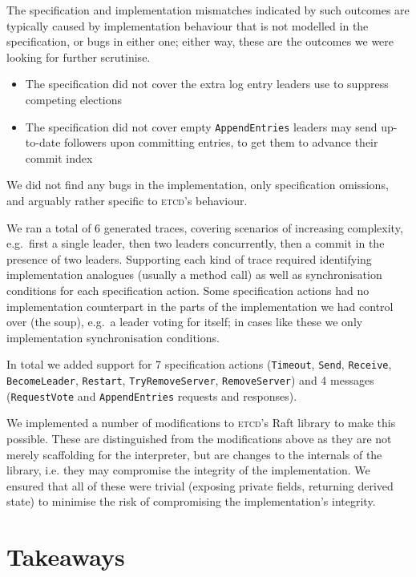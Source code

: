 \documentclass[a4paper]{article}
\newcommand{\tname}[1]{\textsc{#1}\xspace}
\newcommand{\etcd}{\tname{etcd}}
\begin{document}
The specification and implementation mismatches indicated by such outcomes are typically caused by implementation behaviour that is not modelled in the specification, or bugs in either one; either way, these are the outcomes we were looking for further scrutinise.

\begin{itemize}
\item The specification did not cover the extra log entry leaders use to suppress competing elections
\item The specification did not cover empty \texttt{AppendEntries} leaders may send up-to-date followers upon committing entries, to get them to advance their commit index
\end{itemize}

We did not find any bugs in the implementation, only specification omissions, and arguably rather specific to \etcd's behaviour.

We ran a total of 6 generated traces, covering scenarios of increasing complexity, e.g.~first a single leader, then two leaders concurrently, then a commit in the presence of two leaders.
%
Supporting each kind of trace required identifying implementation analogues (usually a method call) as well as synchronisation conditions for each specification action.
%
Some specification actions had no implementation counterpart in the parts of the implementation we had control over (the soup), e.g.~a leader voting for itself; in cases like these we only implementation synchronisation conditions.

In total we added support for 7 specification actions (\texttt{Timeout}, \texttt{Send}, \texttt{Receive}, \texttt{BecomeLeader}, \texttt{Restart}, \texttt{TryRemoveServer}, \texttt{RemoveServer}) and 4 messages (\texttt{RequestVote} and \texttt{AppendEntries} requests and responses).

We implemented a number of modifications to \etcd's Raft library to make this possible.
%
These are distinguished from the modifications above as they are not merely scaffolding for the interpreter, but are changes to the internals of the library, i.e.
%
they may compromise the integrity of the implementation.
%
We ensured that all of these were trivial (exposing private fields, returning derived state) to minimise the risk of compromising the implementation's integrity.

\section{Takeaways}
\end{document}
